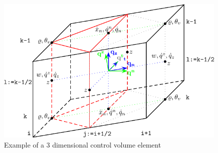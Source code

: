 \begin{figure}[t]
%
\begin{center}
\includegraphics{fig_edge_volume.pdf}
\end{center}
\caption{Example of a 3 dimensional control volume element}
\label{cont_volu}
\end{figure}

